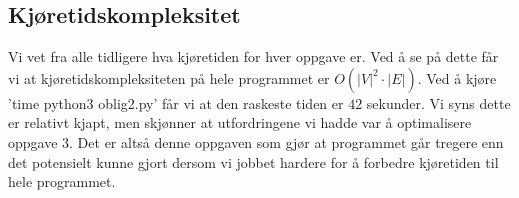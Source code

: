 \documentclass[a4paper, article, oneside, norsk]{memoir} %
\newcommand{\0}{\mathbf{0}}
\newcommand{\1}{\mathbf{1}}
\begin{document}
\subsection*{Kjøretidskompleksitet}
Vi vet fra alle tidligere hva kjøretiden for hver oppgave er. Ved å se på dette får vi at kjøretidskompleksiteten på hele programmet er $O(|V|^2 \cdot |E|)$. Ved å kjøre 'time python3 oblig2.py' får vi at den raskeste tiden er $42$ sekunder. Vi syns dette er relativt kjapt, men skjønner at utfordringene vi hadde var å optimalisere oppgave $3$. Det er altså denne oppgaven som gjør at programmet går tregere enn det potensielt kunne gjort dersom vi jobbet hardere for å forbedre kjøretiden til hele programmet.
\end{document}
